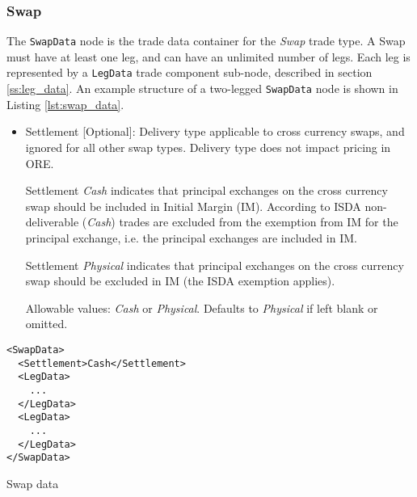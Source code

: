 \subsubsection{Swap}

The \lstinline!SwapData! node is the trade data container for the \emph{Swap} trade type. A Swap must have at least one leg,
and can have an unlimited number of legs. Each leg is represented by a \lstinline!LegData! trade component sub-node,
described in section \ref{ss:leg_data}. An example structure of a two-legged \lstinline!SwapData!
node is shown in Listing \ref{lst:swap_data}.
\begin{itemize}
\item Settlement [Optional]: Delivery type applicable to cross currency swaps, and ignored for all other swap types. Delivery type does not impact pricing in ORE.  

Settlement \emph{Cash} indicates that principal exchanges on the cross currency swap should be included in Initial Margin (IM). According to ISDA non-deliverable (\emph{Cash}) trades are excluded from the exemption from IM for the principal exchange, i.e. the principal exchanges are included in IM. 

Settlement \emph{Physical} indicates that principal exchanges on the cross currency swap should be excluded in IM (the ISDA exemption applies).  

Allowable values: \emph{Cash} or \emph{Physical}.  Defaults to \emph{Physical} if left blank or omitted.
\end{itemize}

\begin{listing}[H]
\begin{verbatim}
<SwapData>
  <Settlement>Cash</Settlement>
  <LegData>
    ...
  </LegData>
  <LegData>
    ...
  </LegData>
</SwapData>
\end{verbatim}
\caption{Swap data}
\label{lst:swap_data}
\end{listing}
